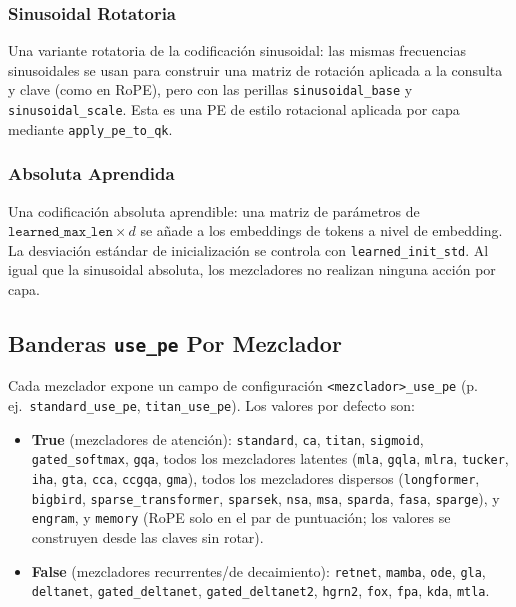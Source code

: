 \subsubsection{Sinusoidal Rotatoria}

Una variante rotatoria de la codificación sinusoidal: las mismas
frecuencias sinusoidales se usan para construir una matriz de rotación
aplicada a la consulta y clave (como en RoPE), pero con las perillas
\texttt{sinusoidal\_base} y \texttt{sinusoidal\_scale}. Esta es una PE
de estilo rotacional aplicada por capa mediante
\texttt{apply\_pe\_to\_qk}.

\subsubsection{Absoluta Aprendida}

Una codificación absoluta aprendible: una matriz de parámetros de
$\texttt{learned\_max\_len} \times d$ se añade a los embeddings de
tokens a nivel de embedding. La desviación estándar de inicialización se
controla con \texttt{learned\_init\_std}. Al igual que la sinusoidal
absoluta, los mezcladores no realizan ninguna acción por capa.

\subsection{Banderas \texttt{use\_pe} Por Mezclador}

Cada mezclador expone un campo de configuración
\texttt{<mezclador>\_use\_pe} (p.\,ej.\
\texttt{standard\_use\_pe}, \texttt{titan\_use\_pe}). Los
valores por defecto son:

\begin{itemize}
\item \textbf{True} (mezcladores de atención): \texttt{standard}, \texttt{ca},
  \texttt{titan}, \texttt{sigmoid},
  \texttt{gated\_softmax}, \texttt{gqa}, todos los
  mezcladores latentes (\texttt{mla}, \texttt{gqla},
  \texttt{mlra}, \texttt{tucker}, \texttt{iha},
  \texttt{gta}, \texttt{cca}, \texttt{ccgqa},
  \texttt{gma}), todos los mezcladores dispersos
  (\texttt{longformer}, \texttt{bigbird},
  \texttt{sparse\_transformer}, \texttt{sparsek},
  \texttt{nsa}, \texttt{msa}, \texttt{sparda},
  \texttt{fasa}, \texttt{sparge}), y
  \texttt{engram}, y \texttt{memory} (RoPE solo en el par de
  puntuación; los valores se construyen desde las claves sin rotar).
\item \textbf{False} (mezcladores recurrentes/de decaimiento):
  \texttt{retnet}, \texttt{mamba}, \texttt{ode},
  \texttt{gla}, \texttt{deltanet},
  \texttt{gated\_deltanet}, \texttt{gated\_deltanet2},
  \texttt{hgrn2}, \texttt{fox}, \texttt{fpa}, \texttt{kda},
  \texttt{mtla}.
\end{itemize}

